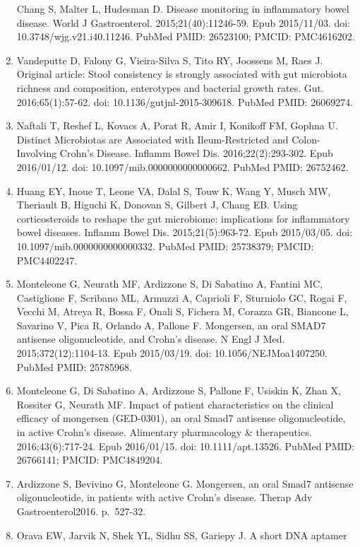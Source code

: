 \documentclass[11pt,]{article}
\begin{document}
\begin{enumerate}
  Chang S, Malter L, Hudesman D. Disease monitoring in inflammatory
  bowel disease. World J Gastroenterol. 2015;21(40):11246-59. Epub
  2015/11/03. doi: 10.3748/wjg.v21.i40.11246. PubMed PMID: 26523100;
  PMCID: PMC4616202.
\item
  Vandeputte D, Falony G, Vieira-Silva S, Tito RY, Joossens M, Raes J.
  Original article: Stool consistency is strongly associated with gut
  microbiota richness and composition, enterotypes and bacterial growth
  rates. Gut. 2016;65(1):57-62. doi: 10.1136/gutjnl-2015-309618. PubMed
  PMID: 26069274.
\item
  Naftali T, Reshef L, Kovacs A, Porat R, Amir I, Konikoff FM, Gophna U.
  Distinct Microbiotas are Associated with Ileum-Restricted and
  Colon-Involving Crohn's Disease. Inflamm Bowel Dis.
  2016;22(2):293-302. Epub 2016/01/12. doi:
  10.1097/mib.0000000000000662. PubMed PMID: 26752462.
\item
  Huang EY, Inoue T, Leone VA, Dalal S, Touw K, Wang Y, Musch MW,
  Theriault B, Higuchi K, Donovan S, Gilbert J, Chang EB. Using
  corticosteroids to reshape the gut microbiome: implications for
  inflammatory bowel diseases. Inflamm Bowel Dis. 2015;21(5):963-72.
  Epub 2015/03/05. doi: 10.1097/mib.0000000000000332. PubMed PMID:
  25738379; PMCID: PMC4402247.
\item
  Monteleone G, Neurath MF, Ardizzone S, Di Sabatino A, Fantini MC,
  Castiglione F, Scribano ML, Armuzzi A, Caprioli F, Sturniolo GC, Rogai
  F, Vecchi M, Atreya R, Bossa F, Onali S, Fichera M, Corazza GR,
  Biancone L, Savarino V, Pica R, Orlando A, Pallone F. Mongersen, an
  oral SMAD7 antisense oligonucleotide, and Crohn's disease. N Engl J
  Med. 2015;372(12):1104-13. Epub 2015/03/19. doi:
  10.1056/NEJMoa1407250. PubMed PMID: 25785968.
\item
  Monteleone G, Di Sabatino A, Ardizzone S, Pallone F, Usiskin K, Zhan
  X, Rossiter G, Neurath MF. Impact of patient characteristics on the
  clinical efficacy of mongersen (GED-0301), an oral Smad7 antisense
  oligonucleotide, in active Crohn's disease. Alimentary pharmacology \&
  therapeutics. 2016;43(6):717-24. Epub 2016/01/15. doi:
  10.1111/apt.13526. PubMed PMID: 26766141; PMCID: PMC4849204.
\item
  Ardizzone S, Bevivino G, Monteleone G. Mongersen, an oral Smad7
  antisense oligonucleotide, in patients with active Crohn's disease.
  Therap Adv Gastroenterol2016. p.~527-32.
\item
  Orava EW, Jarvik N, Shek YL, Sidhu SS, Gariepy J. A short DNA aptamer

\end{enumerate}
\end{document}

